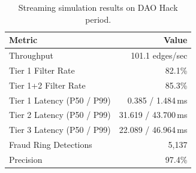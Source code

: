\begin{table}[t]
\centering
\caption{Streaming simulation results on DAO Hack period.}
\label{tab:streaming}
\begin{tabular}{lr}
\toprule
\textbf{Metric} & \textbf{Value} \\
\midrule
Throughput & 101.1 edges/sec \\
Tier 1 Filter Rate & 82.1\% \\
Tier 1+2 Filter Rate & 85.3\% \\
Tier 1 Latency (P50 / P99) & 0.385 / 1.484\,ms \\
Tier 2 Latency (P50 / P99) & 31.619 / 43.700\,ms \\
Tier 3 Latency (P50 / P99) & 22.089 / 46.964\,ms \\
Fraud Ring Detections & 5,137 \\
Precision & 97.4\% \\
\bottomrule
\end{tabular}
\end{table}
